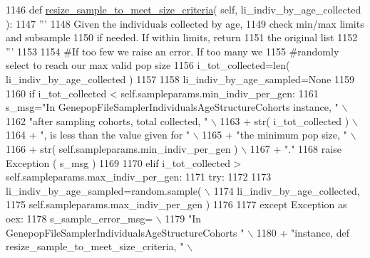 \begin{DoxyCode}
1146     \textcolor{keyword}{def }\hyperlink{classnegui_1_1genepopfilesampler_1_1GenepopFileSamplerIndividualsAgeStructureCohorts_a28deaac6347b19f565b2a50f233a6f06}{resize\_sample\_to\_meet\_size\_criteria}( self, 
      li\_indiv\_by\_age\_collected ):
1147         \textcolor{stringliteral}{'''}
1148 \textcolor{stringliteral}{        Given the individuals collected by age, }
1149 \textcolor{stringliteral}{        check min/max limits and subsample}
1150 \textcolor{stringliteral}{        if needed.  If within limits, return}
1151 \textcolor{stringliteral}{        the original list}
1152 \textcolor{stringliteral}{        '''}
1153 
1154         \textcolor{comment}{#If too few we raise an error.  If too many we}
1155         \textcolor{comment}{#randomly select to reach our max valid pop size}
1156         i\_tot\_collected=len( li\_indiv\_by\_age\_collected )
1157 
1158         li\_indiv\_by\_age\_sampled=\textcolor{keywordtype}{None}
1159 
1160         \textcolor{keywordflow}{if} i\_tot\_collected < self.sampleparams.min\_indiv\_per\_gen:
1161             s\_msg=\textcolor{stringliteral}{"In GenepopFileSamplerIndividualsAgeStructureCohorts instance, "} \(\backslash\)
1162                     \textcolor{stringliteral}{"after sampling cohorts, total collected, "} \(\backslash\)
1163                     + str( i\_tot\_collected ) \(\backslash\)
1164                     + \textcolor{stringliteral}{", is less than the value given for "} \(\backslash\)
1165                     + \textcolor{stringliteral}{"the minimum pop size, "} \(\backslash\)
1166                     + str( self.sampleparams.min\_indiv\_per\_gen ) \(\backslash\)
1167                     + \textcolor{stringliteral}{"."}
1168             \textcolor{keywordflow}{raise} Exception ( s\_msg )
1169 
1170         \textcolor{keywordflow}{elif} i\_tot\_collected > self.sampleparams.max\_indiv\_per\_gen:
1171             \textcolor{keywordflow}{try}:
1172 
1173                 li\_indiv\_by\_age\_sampled=random.sample( \(\backslash\)
1174                                     li\_indiv\_by\_age\_collected,
1175                                     self.sampleparams.max\_indiv\_per\_gen )
1176                                         
1177             \textcolor{keywordflow}{except} Exception \textcolor{keyword}{as} oex:
1178                 s\_sample\_error\_msg= \(\backslash\)
1179                     \textcolor{stringliteral}{"In GenepopFileSamplerIndividualsAgeStructureCohorts "} \(\backslash\)
1180                         + \textcolor{stringliteral}{"instance, def resize\_sample\_to\_meet\_size\_criteria, "}  \(\backslash\)

\end{DoxyCode}
